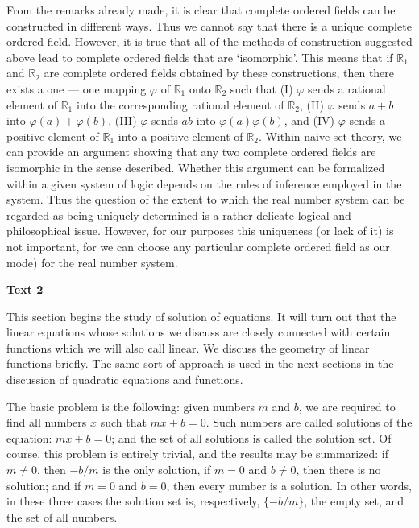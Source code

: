 \documentclass[a4paper]{article}
\newcommand{\ESect}[1]{\medskip\par{\large \textbf{#1}}\par}
\begin{document}
From the remarks already made, it is clear that complete ordered fields can be constructed in different ways. Thus we cannot
say that there is a unique complete ordered field. However, it is true that all of the methods of construction suggested above
lead to complete ordered fields that are `isomorphic'. This means that if $\mathbb{R}_1$ and $\mathbb{R}_2$ are complete
ordered fields obtained by these constructions, then there exists a one --- one mapping $\varphi$ of $\mathbb{R}_1$ onto
$\mathbb{R}_2$ such that (I) $\varphi$ sends a rational element of $\mathbb{R}_1$ into the corresponding rational element of
$\mathbb{R}_2$, (II) $\varphi$ sends $a + b$ into $\varphi(a)+\varphi(b)$, (III) $\varphi$ sends $ab$ into
$\varphi(a)\varphi(b)$, and (IV) $\varphi$ sends a positive element of $\mathbb{R}_1$ into a positive element of
$\mathbb{R}_2$. Within naive set theory, we can provide an argument showing that any two complete ordered fields are isomorphic
in the sense described. Whether this argument can be formalized within a given system of logic depends on the rules of
inference employed in the system. Thus the question of the extent to which the real number system can be regarded as being
uniquely determined is a rather delicate logical and philosophical issue. However, for our purposes this uniqueness
(or lack of it) is not important, for we can choose any particular complete ordered field as our mode) for the real number system.

\ESect{Text 2}
This section begins the study of solution of equations. It will turn out that the linear equations whose solutions we discuss
are closely connected with certain functions which we will also call linear. We discuss the geometry of linear functions briefly.
The same sort of approach is used in the next sections in the discussion of quadratic equations and functions.

The basic problem is the following: given numbers $m$ and $b$, we are required to find all numbers $x$ such that $mx + b = 0$.
Such numbers are called solutions of the equation: $mx + b = 0$; and the set of all solutions is called the solution set. Of
course, this problem is entirely trivial, and the results may be summarized: if $m \neq 0$, then $-b/m$ is the only solution,
if $m = 0$ and $b \neq 0$, then there is no solution; and if $m = 0$ and $b = 0$, then every number is a solution. In other words,
in these three cases the solution set is, respectively, $\{- b/m\}$, the empty set, and the set of all numbers.
\end{document}
